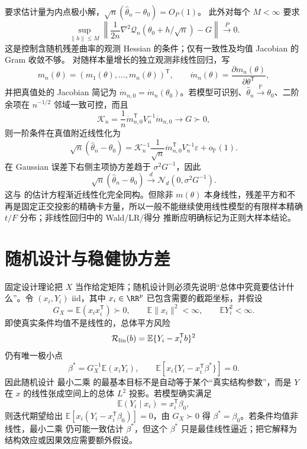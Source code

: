 \begin{theorem}[非线性最小二乘的局部渐近表示]

要求估计量为内点极小解，$\sqrt n(\widehat\theta_n-\theta_0)=O_P(1)$。
此外对每个 $M<\infty$ 要求
\[
 \sup_{\|h\|\le M}\left\|\frac1{2n}\nabla^2\mathcal Q_n(\theta_0+h/\sqrt n)-G\right\|
 \xrightarrow{P}0.
\]
这是控制含随机残差曲率的观测 Hessian 的条件；仅有一致性及均值 Jacobian 的 Gram 收敛不够。
对随样本量增长的独立观测非线性回归，写
\[
 m_n(\theta)=(m_1(\theta),\ldots,m_n(\theta))^{\mathsf T},
 \qquad
 \dot m_n(\theta)
 =\frac{\partial m_n(\theta)}{\partial\theta^{\mathsf T}},
\]
并把真值处的 Jacobian 简记为 $\dot m_{n,0}=\dot m_n(\theta_0)$。若模型可识别、$\widehat\theta_n\xrightarrow{\mathbb P}\theta_0$、二阶余项在 $n^{-1/2}$ 邻域一致可控，而且
\[
 \mathcal K_n=\frac1n\dot m_{n,0}^{\mathsf T}V_n^{-1}\dot m_{n,0}
 \longrightarrow G\succ0,
\]
则一阶条件在真值附近线性化为
\[
 \sqrt n(\widehat\theta_n-\theta_0)
 =\mathcal K_n^{-1}
 \frac1{\sqrt n}\dot m_{n,0}^{\mathsf T}V_n^{-1}\varepsilon
 +o_{\mathbb P}(1).
\]
在 Gaussian 误差下右侧主项协方差趋于 $\sigma^2G^{-1}$，因此
\[
 \sqrt n(\widehat\theta_n-\theta_0)
 \xrightarrow{d}\mathcal N_d(0,\sigma^2G^{-1}).
\]
这与  的估计方程渐近线性化完全同构。但除非 $m(\theta)$ 本身线性，残差平方和不再是固定正交投影的精确卡方量，所以一般不能继续使用线性模型的有限样本精确 $t/F$ 分布；非线性回归中的 Wald/LR/得分 推断应明确标记为正则大样本结论。
\end{theorem}

\section{随机设计与稳健协方差}

\begin{proposition}[随机设计的总体线性投影]
固定设计理论把 $X$ 当作给定矩阵；随机设计则必须先说明“总体中究竟要估计什么”。令 $(x_i,Y_i)$ iid，其中 $x_i\in\RR^p$ 已包含需要的截距坐标，并假设
\[
 G_X=\mathbb E(x_ix_i^{\mathsf T})\succ0,
 \qquad
 \mathbb E\|x_i\|^2<\infty,
 \qquad
 \mathbb E Y_i^2<\infty.
\]
即使真实条件均值不是线性的，总体平方风险
\[
 \mathcal R_{\rm lin}(b)=\mathbb E\{Y_i-x_i^{\mathsf T}b\}^2
\]
仍有唯一极小点
\begin{equation}\label{eq:math-stat-population-linear-projection}
 \beta^*
 =G_X^{-1}\mathbb E(x_iY_i),
 \qquad
 \mathbb E\!
 \left[x_i\{Y_i-x_i^{\mathsf T}\beta^*\}\right]=0.
\end{equation}
因此随机设计 最小二乘 的最基本目标不是自动等于某个“真实结构参数”，而是 $Y$ 在 $x$ 的线性张成空间上的总体 $L^2$ 投影。若模型确实满足
\[
 \mathbb E(Y_i\mid x_i)=x_i^{\mathsf T}\beta_0,
\]
则迭代期望给出 $\mathbb E[x_i(Y_i-x_i^{\mathsf T}\beta_0)]=0$，由 $G_X\succ0$ 得 $\beta^*=\beta_0$。若条件均值非线性，最小二乘 仍可能一致估计 $\beta^*$，但这个 $\beta^*$ 只是最佳线性逼近；把它解释为结构效应或因果效应需要额外假设。
\end{proposition}

